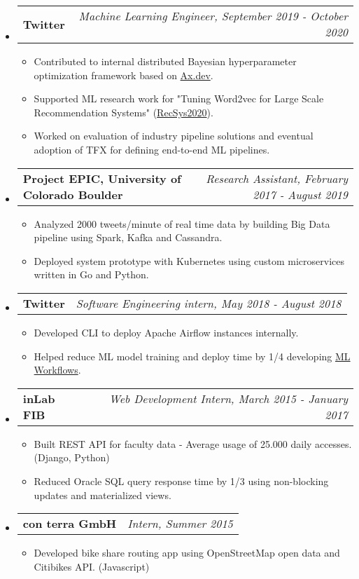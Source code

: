 \documentclass[letterpaper,10pt]{article}
\makeatletter
\newcommand{\resitem}[1]{\item #1 \vspace{-2pt}}
\newcommand{\ressubheading}[4]{
\begin{tabular*}{7.0in}{l@{\extracolsep{\fill}}r}
		\textbf{#1} & \textit{#4} \\
\end{tabular*}\vspace{-6pt}}
\makeatother
\begin{document}
\begin{itemize}
\begin{itemize}
				
			\end{itemize}
		\item
			\ressubheading{Twitter}{Boulder, CO}{Machine Learning Engineer}{Machine Learning Engineer, September 2019 - October 2020}
			\begin{itemize}
				\resitem{Contributed to internal distributed Bayesian hyperparameter optimization framework based on \href{https://ax.dev}{Ax.dev}.} 
				\resitem{Supported ML research work for "Tuning Word2vec for Large Scale Recommendation Systems" (\href{https://arxiv.org/pdf/2009.12192.pdf}{RecSys2020}).}
				\resitem{Worked on evaluation of industry pipeline solutions and eventual adoption of TFX for defining end-to-end ML pipelines.}
			\end{itemize}
		\item
			\ressubheading{Project EPIC, University of Colorado Boulder}{Boulder, CO}{Research Assistant}{Research Assistant, February 2017 - August 2019}
			\begin{itemize}
				\resitem{Analyzed 2000 tweets/minute of real time data by building Big Data pipeline using Spark, Kafka and Cassandra.} 
				\resitem{Deployed system prototype with Kubernetes using custom microservices written in Go and Python.}
			\end{itemize}
			\item
			\ressubheading{Twitter}{Boulder, CO}{Software Engineering intern}{Software Engineering intern, May 2018 - August 2018}
			\begin{itemize}
				\resitem{Developed CLI to deploy Apache Airflow instances internally.}
				\resitem{Helped reduce ML model training and deploy time by 1/4 developing \href{https://blog.twitter.com/engineering/en_us/topics/insights/2018/ml-workflows.html}{ML Workflows}.}
			\end{itemize}
		\item
			\ressubheading{inLab FIB}{Barcelona, Spain}{Web Development Intern}{Web Development Intern, March 2015 - January 2017}
			\begin{itemize}
				\resitem{Built REST API for faculty data - Average usage of 25.000 daily accesses. (Django, Python)}
				\resitem{Reduced Oracle SQL query response time by 1/3 using non-blocking updates and materialized views.}
			\end{itemize}

		\item
			\ressubheading{con terra GmbH}{Münster, Germany}{Intern}{Intern, Summer 2015}
			\begin{itemize}
				\resitem{Developed bike share routing app using OpenStreetMap open data and Citibikes API. (Javascript)}
			\end{itemize}
	\end{itemize}
\end{document}
